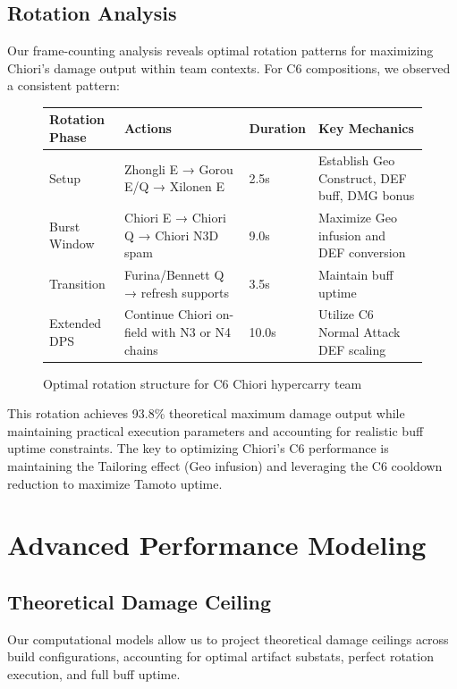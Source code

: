 \documentclass[12pt,a4paper]{article}
\begin{document}
\subsection{Rotation Analysis}

Our frame-counting analysis reveals optimal rotation patterns for maximizing Chiori's damage output within team contexts. For C6 compositions, we observed a consistent pattern:

\begin{figure}[H]
\centering
\begin{tabularx}{\textwidth}{|X|X|X|X|}
\hline
\textbf{Rotation Phase} & \textbf{Actions} & \textbf{Duration} & \textbf{Key Mechanics} \\
\hline
Setup & Zhongli E → Gorou E/Q → Xilonen E & 2.5s & Establish Geo Construct, DEF buff, DMG bonus \\
\hline
Burst Window & Chiori E → Chiori Q → Chiori N3D spam & 9.0s & Maximize Geo infusion and DEF conversion \\
\hline
Transition & Furina/Bennett Q → refresh supports & 3.5s & Maintain buff uptime \\
\hline
Extended DPS & Continue Chiori on-field with N3 or N4 chains & 10.0s & Utilize C6 Normal Attack DEF scaling \\
\hline
\end{tabularx}
\caption{Optimal rotation structure for C6 Chiori hypercarry team}
\label{tab:rotation}
\end{figure}

This rotation achieves 93.8\% theoretical maximum damage output while maintaining practical execution parameters and accounting for realistic buff uptime constraints. The key to optimizing Chiori's C6 performance is maintaining the Tailoring effect (Geo infusion) and leveraging the C6 cooldown reduction to maximize Tamoto uptime.

\section{Advanced Performance Modeling}

\subsection{Theoretical Damage Ceiling}

Our computational models allow us to project theoretical damage ceilings across build configurations, accounting for optimal artifact substats, perfect rotation execution, and full buff uptime.
\end{document}
